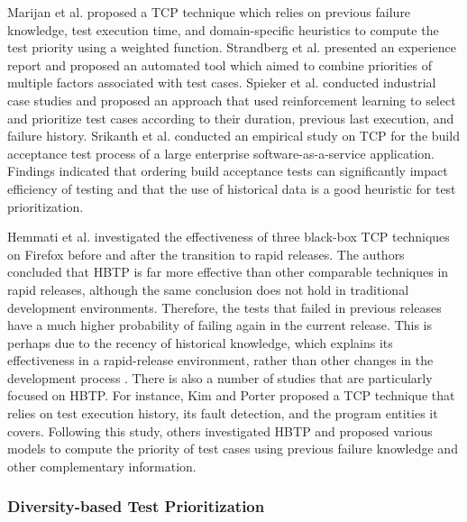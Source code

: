 \documentclass[1p]{elsarticle}
\begin{document}
Marijan et al. \cite{marijan2013test} proposed a TCP technique which relies on previous failure knowledge, test execution time, and domain-specific heuristics to compute the test priority using a weighted function. Strandberg et al. \cite{strandberg2016experience} presented an experience report and proposed an automated tool which aimed to combine priorities of multiple factors associated with test cases. Spieker et al. \cite{spieker2017reinforcement} conducted industrial case studies and proposed an approach that used reinforcement learning to select and prioritize test cases according to their duration, previous last execution, and failure history. Srikanth et al. \cite{srikanth2016test} conducted an empirical study on TCP for the build acceptance test process of a large enterprise software-as-a-service application. Findings indicated that ordering build acceptance tests can significantly impact efficiency of testing and that the use of historical data is a good heuristic for test prioritization.

Hemmati et al. \cite{hemmati2017prioritizing} investigated the effectiveness of three black-box TCP techniques on Firefox before and after the transition to rapid releases. The authors concluded that HBTP is far more effective than other comparable techniques in rapid releases, although the same conclusion does not hold in traditional development environments. Therefore, the tests that failed in previous releases have a much higher probability of failing again in the current release. This is perhaps due to the recency of historical knowledge, which explains its effectiveness in a rapid-release environment, rather than other changes in the development process \cite{hemmati2017prioritizing}. There is also a number of studies that are particularly focused on HBTP. For instance, Kim and Porter \cite{kim2002history} proposed a TCP technique that relies on test execution history, its fault detection, and the program entities it covers. Following this study, others \cite{park2008historical,fazlalizadeh2009prioritizing,khalilian2012improved} investigated HBTP and proposed various models to compute the priority of test cases using previous failure knowledge and other complementary information.


\subsubsection{Diversity-based Test Prioritization}
\end{document}
